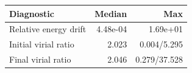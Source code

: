 \begin{tabular}{lrr}
\toprule
Diagnostic & Median & Max\\
\midrule
Relative energy drift & 4.48e-04 & 1.69e+01\\
Initial virial ratio & 2.023 & 0.004/5.295\\
Final virial ratio & 2.046 & 0.279/37.528\\
\bottomrule
\end{tabular}
